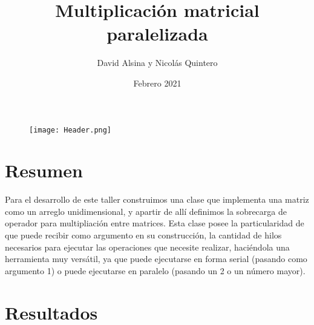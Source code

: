 \documentclass[a4paper,12pt]{article}
\title{Multiplicación matricial paralelizada}
\author{David Alsina y Nicolás Quintero}
\date{Febrero 2021}
\begin{document}
    \begin{figure}[ht]
        \centering
        \texttt{[image: Header.png]}
        \maketitle
    \end{figure}

    \section{Resumen}
    
    Para el desarrollo de este taller construimos una clase que implementa una matriz como un arreglo unidimensional, y apartir de allí definimos la sobrecarga de operador para multipliación entre matrices. Esta clase posee la particularidad de que puede recibir como argumento en su construcción, la cantidad de hilos necesarios para ejecutar las operaciones que necesite realizar, haciéndola una herramienta muy versátil, ya que puede ejecutarse en forma serial (pasando como argumento 1) 
    o puede ejecutarse en paralelo (pasando un 2 o un número mayor).
    
    \section{Resultados}
\end{document}
